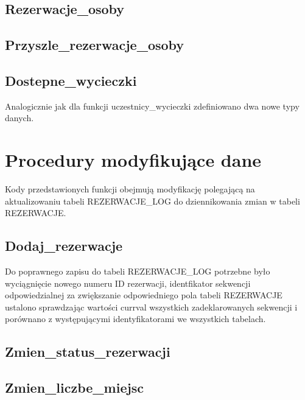 \documentclass[12pt, a4paper]{mwrep}
\begin{document}
\section{Rezerwacje\_osoby}



\section{Przyszle\_rezerwacje\_osoby}



\section{Dostepne\_wycieczki}



Analogicznie jak dla funkcji uczestnicy\_wycieczki zdefiniowano dwa nowe typy danych.

\chapter{Procedury modyfikujące dane}

Kody przedstawionych funkcji obejmują modyfikację polegającą na aktualizowaniu tabeli REZERWACJE\_LOG do dziennikowania zmian w tabeli REZERWACJE.

\section{Dodaj\_rezerwacje}



Do poprawnego zapisu do tabeli REZERWACJE\_LOG potrzebne było wyciągnięcie nowego numeru ID rezerwacji, identfikator sekwencji odpowiedzialnej za zwiększanie odpowiedniego pola tabeli REZERWACJE ustalono sprawdzając wartości currval wszystkich zadeklarowanych sekwencji i porównano z występującymi identyfikatorami we wszystkich tabelach.

\section{Zmien\_status\_rezerwacji}



\section{Zmien\_liczbe\_miejsc}
\end{document}
